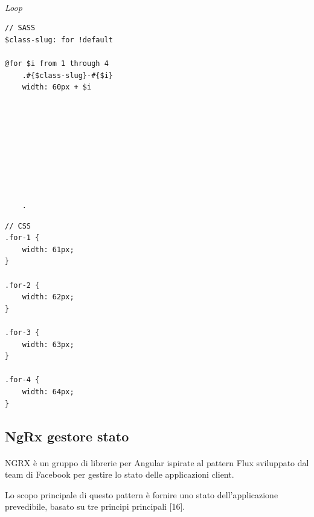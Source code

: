 \paragraph{}
\paragraph{}
\paragraph{}

\textit{Loop}


\begin{multicols}{2}
    \begin{lstlisting}
// SASS
$class-slug: for !default

@for $i from 1 through 4
    .#{$class-slug}-#{$i}
    width: 60px + $i









    .
    \end{lstlisting}

    \columnbreak
    \begin{lstlisting}
// CSS
.for-1 {
    width: 61px;
}

.for-2 {
    width: 62px;
}

.for-3 {
    width: 63px;
}

.for-4 {
    width: 64px;
}
    \end{lstlisting}   
\end{multicols}
   

\subsection{NgRx gestore stato}
\paragraph{}
NGRX è un gruppo di librerie per Angular ispirate al pattern Flux sviluppato dal team di Facebook per gestire
lo stato delle applicazioni client.

Lo scopo principale di questo pattern è fornire uno stato dell'applicazione prevedibile, basato su tre principi principali [16].

